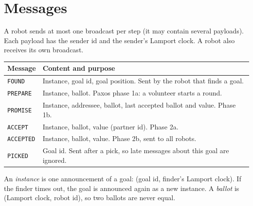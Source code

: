 \documentclass[11pt,a4paper]{article}
\begin{document}
\section{Messages}
A robot sends at most one broadcast per step (it may contain several payloads).
Each payload has the sender id and the sender's Lamport clock. A robot also
receives its own broadcast.

\medskip
\begin{tabular}{@{}lp{12.3cm}@{}}
\toprule
\textbf{Message} & \textbf{Content and purpose}\\
\midrule
\texttt{FOUND}    & Instance, goal id, goal position. Sent by the robot that finds a goal.\\
\texttt{PREPARE}  & Instance, ballot. Paxos phase 1a: a volunteer starts a round.\\
\texttt{PROMISE}  & Instance, addressee, ballot, last accepted ballot and value. Phase 1b.\\
\texttt{ACCEPT}   & Instance, ballot, value (partner id). Phase 2a.\\
\texttt{ACCEPTED} & Instance, ballot, value. Phase 2b, sent to all robots.\\
\texttt{PICKED}   & Goal id. Sent after a pick, so late messages about this goal are ignored.\\
\bottomrule
\end{tabular}

\medskip\noindent
An \emph{instance} is one announcement of a goal: (goal id, finder's Lamport
clock). If the finder times out, the goal is announced again as a new instance. A
\emph{ballot} is (Lamport clock, robot id), so two ballots are never equal.
\end{document}
